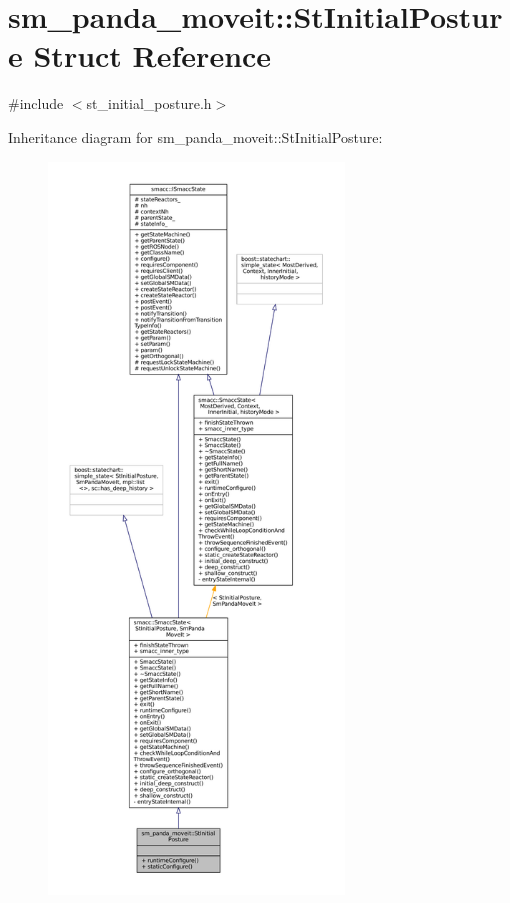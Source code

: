 \hypertarget{structsm__panda__moveit_1_1StInitialPosture}{}\section{sm\+\_\+panda\+\_\+moveit\+:\+:St\+Initial\+Posture Struct Reference}
\label{structsm__panda__moveit_1_1StInitialPosture}


{\ttfamily \#include $<$st\+\_\+initial\+\_\+posture.\+h$>$}



Inheritance diagram for sm\+\_\+panda\+\_\+moveit\+:\+:St\+Initial\+Posture\+:
\nopagebreak
\begin{figure}[H]
\begin{center}
\leavevmode
\includegraphics[height=550pt]{structsm__panda__moveit_1_1StInitialPosture__inherit__graph}
\end{center}
\end{figure}


